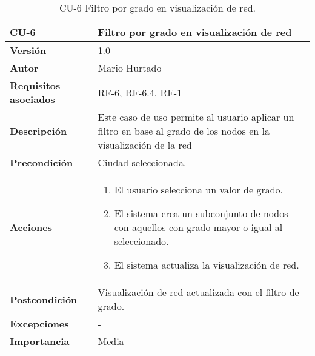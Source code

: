 \begin{table}[p]
	\centering
	\begin{tabularx}{\linewidth}{ p{} p{} }
			\toprule
			\textbf{CU-6}    & \textbf{Filtro por grado en visualización de red}\\
			\toprule
			\textbf{Versión}              & 1.0    \\
			\textbf{Autor}                & Mario Hurtado \\
			\textbf{Requisitos asociados} & RF-6, RF-6.4, RF-1 \\
			\textbf{Descripción}          & Este caso de uso permite al usuario aplicar un filtro en base al grado de los nodos en la visualización de la red \\
			\textbf{Precondición}         & Ciudad seleccionada.\\
			\textbf{Acciones}             &
			\begin{enumerate}
					\def\labelenumi{\arabic{enumi}.}
					\tightlist
					\item El usuario selecciona un valor de grado.
					\item El sistema crea un subconjunto de nodos con aquellos con grado mayor o igual al seleccionado.
					\item El sistema actualiza la visualización de red.
				\end{enumerate}\\
			\textbf{Postcondición}        & Visualización de red actualizada con el filtro de grado.\\
			\textbf{Excepciones}          & - \\
			\textbf{Importancia}          & Media \\
			\bottomrule
		\end{tabularx}
	\caption{CU-6 Filtro por grado en visualización de red.}
\end{table}
%
